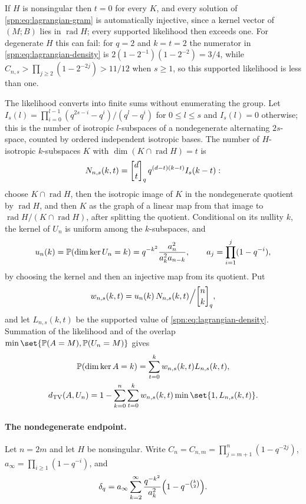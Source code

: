 If $H$ is nonsingular then $t=0$ for every $K$, and every solution of
\eqref{spn:eq:lagrangian-gram} is automatically injective, since a kernel vector of $(M;B)$
lies in $\operatorname{rad}H$; every supported likelihood then exceeds one. For degenerate $H$
this can fail: for $q=2$ and $k=t=2$ the numerator in \eqref{spn:eq:lagrangian-density} is
$2(1-2^{-1})(1-2^{-2})=3/4$, while $C_{n,s}>\prod_{j\ge2}(1-2^{-2j})>11/12$ when $s\ge1$, so
this supported likelihood is less than one.

The likelihood converts into finite sums without enumerating the group. Let
$I_s(l)=\prod_{i=0}^{l-1}(q^{2s-i}-q^i)/(q^l-q^i)$ for $0\le l\le s$ and $I_s(l)=0$
otherwise; this is the number of isotropic $l$-subspaces of a nondegenerate alternating
$2s$-space, counted by ordered independent isotropic bases. The number of $H$-isotropic
$k$-subspaces $K$ with $\dim(K\cap\operatorname{rad}H)=t$ is
\begin{equation}\label{spn:eq:kernel-types}
 N_{n,s}(k,t)=\spnqbin{d}{t}{q}\,q^{(d-t)(k-t)}I_s(k-t):
\end{equation}
choose $K\cap\operatorname{rad}H$, then the isotropic image of $K$ in the nondegenerate
quotient by $\operatorname{rad}H$, and then $K$ as the graph of a linear map from that image to
$\operatorname{rad}H/(K\cap\operatorname{rad}H)$, after splitting the quotient. Conditional on
its nullity $k$, the kernel of $U_n$ is uniform among the $k$-subspaces, and
\begin{equation}\label{spn:eq:uniform-nullity}
 u_n(k)=\mathbb{P}(\dim\ker U_n=k)=q^{-k^2}\frac{a_n^2}{a_k^2a_{n-k}},\qquad
 a_j=\prod_{i=1}^j(1-q^{-i}),
\end{equation}
by choosing the kernel and then an injective map from its quotient. Put
\[
 w_{n,s}(k,t)=u_n(k)\,N_{n,s}(k,t)\Big/\spnqbin nkq ,
\]
and let $L_{n,s}(k,t)$ be the supported value of \eqref{spn:eq:lagrangian-density}. Summation
of the likelihood and of the overlap $\min\set{\spnP(A=M),\spnP(U_n=M)}$ gives
\begin{gather}
 \spnP(\dim\ker A=k)=\sum_{t=0}^kw_{n,s}(k,t)L_{n,s}(k,t),\label{spn:eq:lagrangian-laws}\\
 \spnTV(A,U_n)=1-\sum_{k=0}^n\sum_{t=0}^kw_{n,s}(k,t)\min\set{1,L_{n,s}(k,t)} .\notag
\end{gather}

\paragraph{The nondegenerate endpoint.}
Let $n=2m$ and let $H$ be nonsingular. Write $C_n=C_{n,m}=\prod_{j=m+1}^n(1-q^{-2j})$,
$a_\infty=\prod_{i\ge1}(1-q^{-i})$, and
\begin{equation}\label{spn:eq:deltaq}
 \delta_q=a_\infty\sum_{k=2}^\infty\frac{q^{-k^2}}{a_k^2}\Bigl(1-q^{-\binom k2}\Bigr).
\end{equation}

